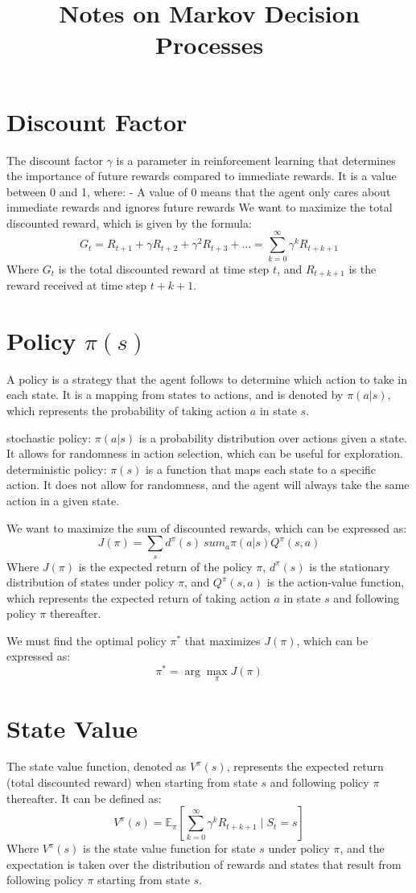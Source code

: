 \documentclass[conference]{IEEEtran}
\title{Notes on Markov Decision Processes}
\author{
\IEEEauthorblockN{Luis Mendez}
}
\begin{document}
\maketitle

\section*{Discount Factor}
The discount factor $\gamma$ is a parameter in reinforcement learning that determines the importance of future rewards compared to immediate rewards. It is a value between 0 and 1, where:
- A value of 0 means that the agent only cares about immediate rewards and ignores future rewards
We want to maximize the total discounted reward, which is given by the formula:
$$ G_t = R_{t+1} + \gamma R_{t+2} + \gamma^2 R_{t+3} + \ldots = \sum_{k=0}^{\infty} \gamma^k R_{t+k+1} $$
Where $G_t$ is the total discounted reward at time step $t$, and $R_{t+k+1}$ is the reward received at time step $t+k+1$.

\section*{Policy $\pi(s)$}
A policy is a strategy that the agent follows to determine which action to take in each state. It is a mapping from states to actions, and is denoted by $\pi(a|s)$, which represents the probability of taking action $a$ in state $s$.

stochastic policy: $\pi(a|s)$ is a probability distribution over actions given a state. It allows for randomness in action selection, which can be useful for exploration.
deterministic policy: $\pi(s)$ is a function that maps each state to a specific action. It does not allow for randomness, and the agent will always take the same action in a given state.

We want to maximize the sum of discounted rewards, which can be expressed as:
$$ J(\pi) = \sum_{s} d^{\pi}(s) \
sum_{a} \pi(a|s) Q^{\pi}(s,a) $$
Where $J(\pi)$ is the expected return of the policy $\pi$, $d^{\pi}(s)$ is the stationary distribution of states under policy $\pi$, and $Q^{\pi}(s,a)$ is the action-value function, which represents the expected return of taking action $a$ in state $s$ and following policy $\pi$ thereafter.

We must find the optimal policy $\pi^*$ that maximizes $J(\pi)$, which can be expressed as:
$$ \pi^* = \arg\max_{\pi} J(\pi) $$

\section*{State Value}
The state value function, denoted as $V^{\pi}(s)$, represents the expected return (total discounted reward) when starting from state $s$ and following policy $\pi$ thereafter. It can be defined as:
$$ V^{\pi}(s) = \mathbb{E}_{\pi} \left[ \sum_{k=0}^{\infty} \gamma^k R_{t+k+1} \mid S_t = s \right] $$
Where $V^{\pi}(s)$ is the state value function for state $s$ under policy $\pi$, and the expectation is taken over the distribution of rewards and states that result from following policy $\pi$ starting from state $s$.
\end{document}
